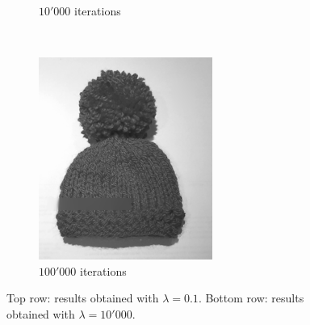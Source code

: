 \documentclass{paper}
\begin{document}
\begin{figure}[h]
\begin{subfigure}[h]{0.3\textwidth}
	\caption*{$10'000$ iterations}
\end{subfigure}
~
\begin{subfigure}[h]{0.3\textwidth}
	\centering
	\includegraphics[width=\textwidth]{hat-iter100000-lambda10000-alpha0_0001}
	\caption*{$100'000$ iterations}
\end{subfigure}
\caption{Top row: results obtained with $\lambda = 0.1$. Bottom row: results obtained with $\lambda = 10'000$.}
\label{fig:lambda-values}
\end{figure}
\end{document}
